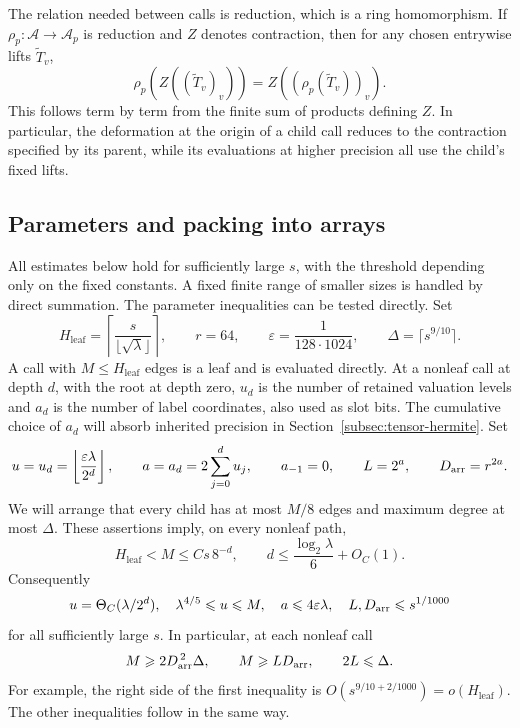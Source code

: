 The relation needed between calls is reduction, which is a ring
homomorphism. If $\rho_p:\mathcal A\to\mathcal A_p$ is reduction
and $Z$ denotes contraction, then for any chosen entrywise lifts
$\widetilde T_v$,
\[
 \rho_p\!\left(Z((\widetilde T_v)_v)\right)
       =Z((\rho_p(\widetilde T_v))_v).
\]
This follows term by term from the finite sum of products defining
$Z$. In particular, the deformation at the origin of a child call
reduces to the contraction specified by its parent, while its
evaluations at higher precision all use the child's fixed lifts.

\subsection{Parameters and packing into arrays}
\label{subsec:tensor-packing}

All estimates below hold for sufficiently large $s$, with the
threshold depending only on the fixed constants.  A fixed finite
range of smaller sizes is handled by direct summation. The parameter
inequalities can be tested directly.  Set
\[
 H_{\mathrm{leaf}}=\left\lceil\frac{s}{\lfloor\sqrt\lambda\rfloor}\right\rceil,
 \qquad r=64,\qquad \varepsilon=\frac1{128\cdot1024},
 \qquad \Delta=\lceil s^{9/10}\rceil.
\]
A call with $M\le H_{\mathrm{leaf}}$ edges is a leaf and is evaluated directly.
At a nonleaf call at depth $d$, with the root at depth zero,
$u_d$ is the number of retained valuation levels and $a_d$ is the
number of label coordinates, also used as slot bits. The cumulative
choice of $a_d$ will absorb inherited precision in
Section~\ref{subsec:tensor-hermite}. Set
\begin{equation}\label{eq:tensor-parameters}
 u=u_d=\left\lfloor\frac{\varepsilon\lambda}{2^d}\right\rfloor,
 \qquad a=a_d=2\sum_{j=0}^d u_j,\qquad
 a_{-1}=0,\qquad L=2^a,\qquad D_{\rm arr}=r^{2a}.
\end{equation}
We will arrange that every child has at most $M/8$ edges and maximum
degree at most $\Delta$.  These assertions imply, on every nonleaf path,
\[
 H_{\mathrm{leaf}}<M\le Cs\,8^{-d},\qquad
 d\le\frac{\log_2\lambda}{6}+O_C(1).
\]
Consequently
\begin{equation}\label{eq:tensor-parameter-bounds}
 u=\Theta_C(\lambda/2^d),\quad
 \lambda^{4/5}\le u\le M,\quad
 a\le4\varepsilon\lambda,\quad
 L,D_{\rm arr}\le s^{1/1000}
\end{equation}
for all sufficiently large $s$.  In particular, at each nonleaf call
\begin{equation}\label{eq:tensor-packing-conditions}
 M\ge2D_{\rm arr}^{\,2}\Delta,\qquad
 M\ge L D_{\rm arr},\qquad 2L\le\Delta.
\end{equation}
For example, the right side of the first inequality is
$O(s^{9/10+2/1000})=o(H_{\mathrm{leaf}})$.  The other inequalities follow in the
same way.

